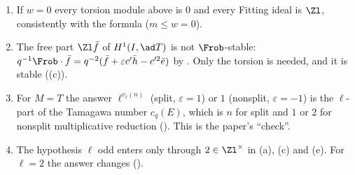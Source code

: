 \begin{remark}\label{rem:cohomology:model-remarks}
\begin{enumerate}[label=(\roman*)]
\item If $w=0$ every torsion module above is $0$ and every Fitting ideal is $\Zl$, consistently with the formula ($m\le w=0$).
\item The free part $\Zl\bar f$ of $H^1(I,\ad T)$ is not $\Frob$-stable: $q^{-1}\Frob\cdot\bar f=q^{-2}(\bar f+\varepsilon c'\bar h-c'^2\bar e)$ by . Only the
torsion is needed, and it is stable ((c)).
\item For $M=T$ the answer $\ell^{v_\ell(n)}$ (split, $\varepsilon=1$) or $1$ (nonsplit, $\varepsilon=-1$) is the $\ell$-part of the Tamagawa number $c_q(E)$, which is $n$ for
split and $1$ or $2$ for nonsplit multiplicative reduction (). This is the paper's ``check''.
\item The hypothesis $\ell$ odd enters only through $2\in\Zl^\times$ in (a), (c) and (e). For $\ell=2$ the answer changes ().
\end{enumerate}
\end{remark}

